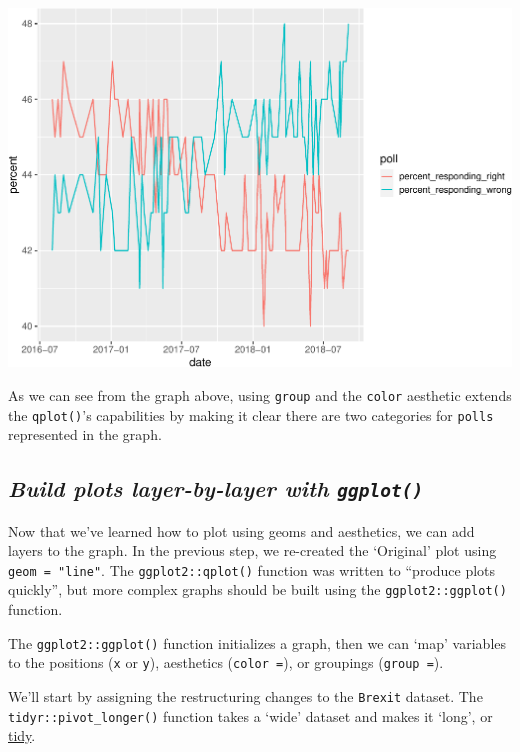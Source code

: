 \documentclass[letterpaper,12pt,twoside,]{pinp}
\begin{document}
\begin{center}\includegraphics{03-intro-to-ggplot2_files/figure-latex/pivot_longer-qplot-1} \end{center}

As we can see from the graph above, using \texttt{group} and the
\texttt{color} aesthetic extends the \texttt{qplot()}'s capabilities by
making it clear there are two categories for \texttt{polls} represented
in the graph.

\hypertarget{build-plots-layer-by-layer-with-ggplot}{%
\subsection{\texorpdfstring{\textbf{\emph{Build plots layer-by-layer
with
\texttt{ggplot()}}}}{Build plots layer-by-layer with ggplot()}}\label{build-plots-layer-by-layer-with-ggplot}}

Now that we've learned how to plot using geoms and aesthetics, we can
add layers to the graph. In the previous step, we re-created the
`Original' plot using \texttt{geom\ =\ "line"}. The
\texttt{ggplot2::qplot()} function was written to ``produce plots
quickly'', but more complex graphs should be built using the
\texttt{ggplot2::ggplot()} function.

The \texttt{ggplot2::ggplot()} function initializes a graph, then we can
`map' variables to the positions (\texttt{x} or \texttt{y}), aesthetics
(\texttt{color\ =}), or groupings (\texttt{group\ =}).

We'll start by assigning the restructuring changes to the
\texttt{Brexit} dataset. The \texttt{tidyr::pivot\_longer()} function
takes a `wide' dataset and makes it `long', or
\href{https://vita.had.co.nz/papers/tidy-data.pdf}{tidy}.
\end{document}
